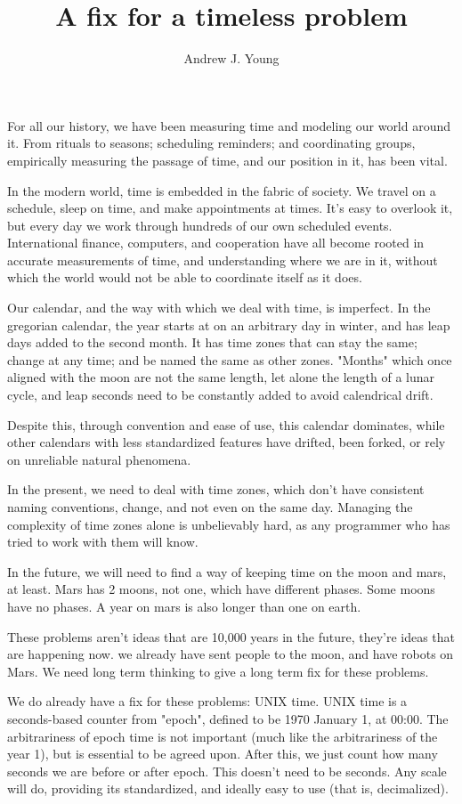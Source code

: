 \documentclass{article}
\title{A fix for a timeless problem}
\author{Andrew J. Young}
\begin{document}
\maketitle

For all our history, we have been measuring time and modeling our world around
it. From rituals to seasons; scheduling reminders; and coordinating groups,
empirically measuring the passage of time, and our position in it, has been
vital.

In the modern world, time is embedded in the fabric of society. We travel on a
schedule, sleep on time, and make appointments at times. It's easy to overlook
it, but every day we work through hundreds of our own scheduled events.
International finance, computers, and cooperation have all become rooted in
accurate measurements of time, and understanding where we are in it, without
which the world would not be able to coordinate itself as it does.

Our calendar, and the way with which we deal with time, is imperfect. In the
gregorian calendar, the year starts at on an arbitrary day in winter, and has
leap days added to the second month. It has time zones that can stay the same;
change at any time; and be named the same as other zones. "Months" which once
aligned with the moon are not the same length, let alone the length of a lunar
cycle, and leap seconds need to be constantly added to avoid calendrical drift.

Despite this, through convention and ease of use, this calendar dominates, while
other calendars with less standardized features have drifted, been forked, or
rely on unreliable natural phenomena.

In the present, we need to deal with time zones, which don't have consistent
naming conventions, change, and not even on the same day. Managing the
complexity of time zones alone is unbelievably hard, as any programmer who has
tried to work with them will know.

In the future, we will need to find a way of keeping time on the moon and mars,
at least. Mars has 2 moons, not one, which have different phases. Some moons
have no phases. A year on mars is also longer than one on earth.

These problems aren't ideas that are 10,000 years in the future, they're ideas
that are happening now. we already have sent people to the moon, and have robots
on Mars. We need long term thinking to give a long term fix for these problems.

We do already have a fix for these problems: UNIX time. UNIX time is a
seconds-based counter from "epoch", defined to be 1970 January 1, at 00:00. The
arbitrariness of epoch time is not important (much like the arbitrariness of the
year 1), but is essential to be agreed upon. After this, we just count how many
seconds we are before or after epoch. This doesn't need to be seconds. Any scale
will do, providing its standardized, and ideally easy to use (that is,
decimalized).
\end{document}
